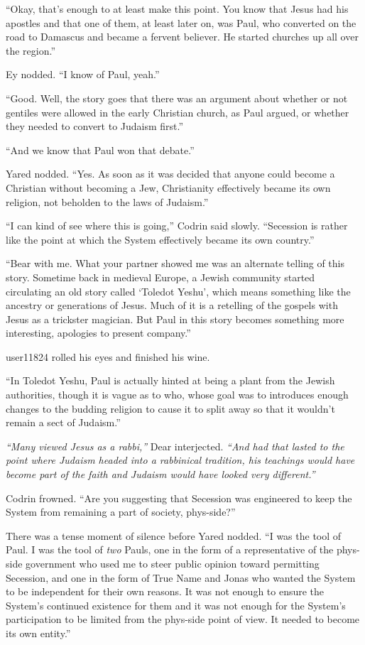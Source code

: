 ``Okay, that's enough to at least make this point. You know that Jesus had his apostles and that one of them, at least later on, was Paul, who converted on the road to Damascus and became a fervent believer. He started churches up all over the region.''

Ey nodded. ``I know of Paul, yeah.''

``Good. Well, the story goes that there was an argument about whether or not gentiles were allowed in the early Christian church, as Paul argued, or whether they needed to convert to Judaism first.''

``And we know that Paul won that debate.''

Yared nodded. ``Yes. As soon as it was decided that anyone could become a Christian without becoming a Jew, Christianity effectively became its own religion, not beholden to the laws of Judaism.''

``I can kind of see where this is going,'' Codrin said slowly. ``Secession is rather like the point at which the System effectively became its own country.''

``Bear with me. What your partner showed me was an alternate telling of this story. Sometime back in medieval Europe, a Jewish community started circulating an old story called `Toledot Yeshu', which means something like the ancestry or generations of Jesus. Much of it is a retelling of the gospels with Jesus as a trickster magician. But Paul in this story becomes something more interesting, apologies to present company.''

user11824 rolled his eyes and finished his wine.

``In Toledot Yeshu, Paul is actually hinted at being a plant from the Jewish authorities, though it is vague as to who, whose goal was to introduces enough changes to the budding religion to cause it to split away so that it wouldn't remain a sect of Judaism.''

\emph{``Many viewed Jesus as a rabbi,''} Dear interjected. \emph{``And had that lasted to the point where Judaism headed into a rabbinical tradition, his teachings would have become part of the faith and Judaism would have looked very different.''}

Codrin frowned. ``Are you suggesting that Secession was engineered to keep the System from remaining a part of society, phys-side?''

There was a tense moment of silence before Yared nodded. ``I was the tool of Paul. I was the tool of \emph{two} Pauls, one in the form of a representative of the phys-side government who used me to steer public opinion toward permitting Secession, and one in the form of True Name and Jonas who wanted the System to be independent for their own reasons. It was not enough to ensure the System's continued existence for them and it was not enough for the System's participation to be limited from the phys-side point of view. It needed to become its own entity.''

